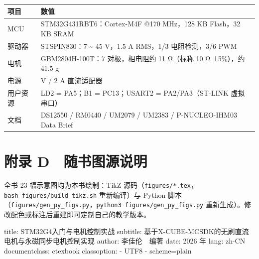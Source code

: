 \documentclass[
  UTF8,
  scheme=plain,
  fontsize=10pt,
  openany
]{ctexbook}
\begin{document}
{\def\LTcaptype{none} %
\begin{longtable}[]{@{}
  >{\raggedright\arraybackslash}p{}
  >{\raggedright\arraybackslash}p{}@{}}
\toprule\noalign{}
\begin{minipage}[b]{\linewidth}\raggedright
项目
\end{minipage} & \begin{minipage}[b]{\linewidth}\raggedright
数值
\end{minipage} \\
\midrule\noalign{}
\endhead
\bottomrule\noalign{}
\endlastfoot
MCU & STM32G431RBT6：Cortex-M4F @170 MHz，128 KB Flash，32 KB SRAM \\
驱动器 & STSPIN830：7 \textasciitilde{} 45 V，1.5 A RMS，1/3
电阻检测，3/6 PWM \\
电机 & GBM2804H-100T：7 对极，相电阻约 11 Ω（标称 10 Ω ±5\%），约 41.5
g \\
电源 & 12 V / 2 A 直流适配器 \\
用户资源 & LD2 = PA5；B1 = PC13；USART2 = PA2/PA3（ST-LINK 虚拟串口） \\
文档 & DS12550 / RM0440 / UM2079 / UM2383 / P-NUCLEO-IHM03 Data Brief \\
\end{longtable}
}

\section*{附录
D　随书图源说明}\label{ux9644ux5f55-d-ux968fux4e66ux56feux6e90ux8bf4ux660e}

全书 23 幅示意图均为本书绘制：TikZ
源码（\texttt{figures/*.tex}，\texttt{bash\ figures/build\_tikz.sh}
重新编译）与 Python
脚本（\texttt{figures/gen\_py\_figs.py}，\texttt{python3\ figures/gen\_py\_figs.py}
重新生成）。修改配色或标注后重建即可定制自己的教学版本。

title: STM32G4入门与电机控制实战 subtitle:
基于X-CUBE-MCSDK的无刷直流电机与永磁同步电机控制实现 author:
李佳伦　编著 date: 2026 年 lang: zh-CN documentclass: ctexbook
classoption: - UTF8 - scheme=plain

\backmatter
\end{document}
